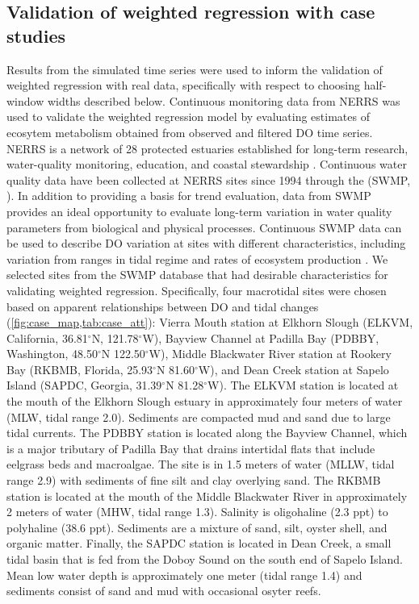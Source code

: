 \documentclass[letterpaper,12pt,oneside]{article}\usepackage[]{graphicx}\usepackage[]{color}
\begin{document}
\subsection{Validation of weighted regression with case studies}

Results from the simulated time series were used to inform the validation of weighted regression with real data, specifically with respect to choosing half-window widths described below.  Continuous monitoring data from \ac{NERRS} was used to validate the weighted regression model by evaluating estimates of ecosytem metabolism obtained from observed and filtered \ac{DO} time series. \ac{NERRS} is a network of 28 protected estuaries established for long-term research, water-quality monitoring, education, and coastal stewardship \citep{Wenner04}.  Continuous water quality data have been collected at \ac{NERRS} sites since 1994 through the  (\acs{SWMP}, ).  In addition to providing a basis for trend evaluation, data from \ac{SWMP} provides an ideal opportunity to evaluate long-term variation in water quality parameters from biological and physical processes.  Continuous \ac{SWMP} data can be used to describe \ac{DO} variation at sites with different characteristics, including variation from ranges in tidal regime \citep{Sanger02} and rates of ecosystem production \citep{Caffrey03,Caffrey04}.  We selected sites from the \ac{SWMP} database that had desirable characteristics for validating weighted regression.  Specifically, four macrotidal sites were chosen based on apparent relationships between \ac{DO} and tidal changes (\cref{fig:case_map,tab:case_att}): Vierra Mouth station at Elkhorn Slough (ELKVM, California, 36.81$^{\circ}$N, 121.78$^{\circ}$W), Bayview Channel at Padilla Bay (PDBBY, Washington, 48.50$^{\circ}$N 122.50$^{\circ}$W), Middle Blackwater River station at Rookery Bay (RKBMB, Florida, 25.93$^{\circ}$N 81.60$^{\circ}$W), and Dean Creek station at Sapelo Island (SAPDC, Georgia, 31.39$^{\circ}$N 81.28$^{\circ}$W).  The ELKVM station is located at the mouth of the Elkhorn Slough estuary in approximately four meters of water (MLW, tidal range 2.0).  Sediments are compacted mud and sand due to large tidal currents.  The PDBBY station is located along the Bayview Channel, which is a major tributary of Padilla Bay that drains intertidal flats that include eelgrass beds and macroalgae.  The site is in 1.5 meters of water (MLLW, tidal range 2.9) with sediments of fine silt and clay overlying sand.  The RKBMB station is located at the mouth of the Middle Blackwater River in approximately 2 meters of water (MHW, tidal range 1.3).  Salinity is oligohaline (2.3 ppt) to polyhaline (38.6 ppt).  Sediments are a mixture of sand, silt, oyster shell, and organic matter.  Finally, the SAPDC station is located in Dean Creek, a small tidal basin that is fed from the Doboy Sound on the south end of Sapelo Island.  Mean low water depth is approximately one meter (tidal range 1.4) and sediments consist of sand and mud with occasional osyter reefs. 
\end{document}
